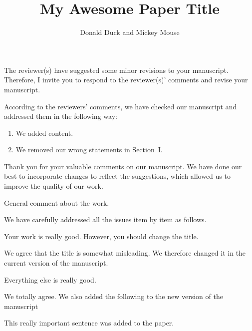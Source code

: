 \documentclass[12pt,english]{reviewresponse}
\title{My Awesome Paper Title}
\author{Donald Duck\affil{1,*} and Mickey Mouse\affil{2}}
\affiliation{
	\affil{1} Department of Quacking, Duck University, Duckburg, USA\\
	\affil{2} Department of Mousing, Mouse University, Mouseton, USA
}
\begin{document}
\maketitle



\editor
\begin{generalcomment}
	The reviewer(s) have suggested some minor revisions to your manuscript. Therefore, I invite you to respond to the reviewer(s)' comments and revise your manuscript.
\end{generalcomment}
\begin{revresponse}
	According to the reviewers' comments, we have checked our manuscript and addressed them in the following way:
	\begin{enumerate}
		\item We added content.
		\item We removed our wrong statements in Section~I.
	\end{enumerate}
\end{revresponse}
\begin{concludingresponse}
	Thank you for your valuable comments on our manuscript. 
	We have done our best to incorporate changes to reflect the suggestions, which allowed us to improve the quality of our work.
\end{concludingresponse}


\reviewer
\begin{generalcomment}
	General comment about the work.
\end{generalcomment}
\begin{revresponse}
	We have carefully addressed all the issues item by item as follows.
\end{revresponse}

\begin{revcomment}
	Your work is really good. However, you should change the title.
\end{revcomment}
\begin{revresponse}
	We agree that the title is somewhat misleading.
	We therefore changed it in the current version of the manuscript.
\end{revresponse}

\begin{revcomment}
	Everything else is really good.
\end{revcomment}
\begin{revresponse}
	We totally agree. We also added the following to the new version of the manuscript
	\begin{changes}
		This really important sentence was added to the paper.
	\end{changes}
\end{revresponse}
\end{document}
